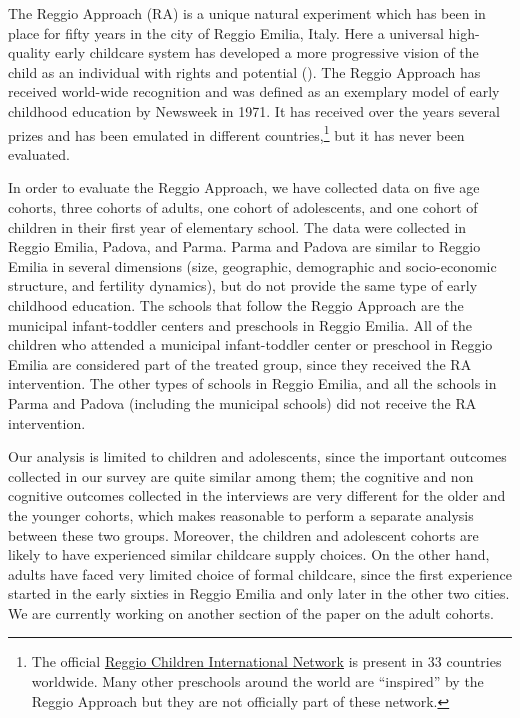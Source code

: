 \documentclass[12pt]{article}
\begin{document}
The Reggio Approach (RA) is a unique natural experiment which has been in place for fifty years in the city of Reggio Emilia, Italy. Here a universal high-quality early childcare system has developed a more progressive vision of the child as an individual with rights and potential (\cite{Malaguzzi1993}). The Reggio Approach has received world-wide recognition and was defined as an exemplary model of early childhood education by Newsweek in 1971. It has received over the years several prizes and has been emulated in different countries,\footnote{The official \href{http://www.reggiochildren.it/network/?lang=en}{Reggio Children International Network} is present in 33 countries worldwide. Many other preschools around the world are ``inspired'' by the Reggio Approach but they are not officially part of these network.} but it has never been evaluated.

In order to evaluate the Reggio Approach, we have collected data on five age cohorts, three cohorts of adults, one cohort of adolescents, and one cohort of children in their first year of elementary school. The data were collected in Reggio Emilia, Padova, and Parma. Parma and Padova are similar to Reggio Emilia in several dimensions (size, geographic, demographic and socio-economic structure, and fertility dynamics), but do not provide the same type of early childhood education. The schools that follow the Reggio Approach are the municipal infant-toddler centers and preschools in Reggio Emilia. All of the children who attended a municipal infant-toddler center or preschool in Reggio Emilia are considered part of the treated group, since they received the RA intervention. The other types of schools in Reggio Emilia, and all the schools in Parma and Padova (including the municipal schools) did not receive the RA intervention.

Our analysis is limited to children and adolescents, since the important outcomes collected in our survey are quite similar among them; the cognitive and non cognitive outcomes collected in the interviews are very different for the older and the younger cohorts, which makes reasonable to perform a separate analysis between these two groups. Moreover, the children and adolescent cohorts are likely to have experienced similar childcare supply choices. On the other hand, adults have faced very limited choice of formal childcare, since the first experience started in the early sixties in Reggio Emilia and only later in the other two cities. We are currently working on another section of the paper on the adult cohorts.
\end{document}
